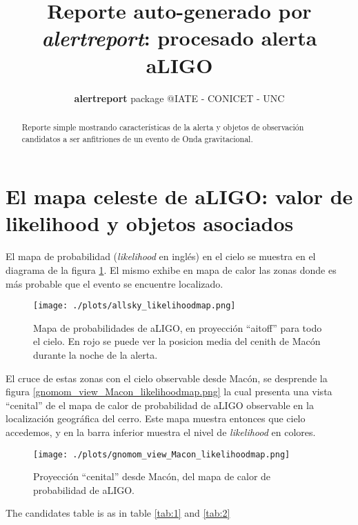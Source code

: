 \documentclass[a4paper,10pt]{article}
\title{Reporte auto-generado por \textit{alertreport}: procesado alerta aLIGO}
\author{\textbf{alertreport} package @IATE - CONICET - UNC}
\begin{document}
\maketitle

\begin{abstract}
Reporte simple mostrando caracter\'{i}sticas de la alerta y objetos de observaci\'on 
candidatos a ser anfitriones de un evento de Onda gravitacional.
\end{abstract}

\section{El mapa celeste de aLIGO: valor de likelihood y objetos asociados}
El mapa de probabilidad (\textit{likelihood} en ingl\'es) en el cielo se muestra en el diagrama
de la figura \ref{fig:aitoff_likelihood_map}. El mismo exhibe en mapa de calor las zonas donde es 
m\'as probable que el evento se encuentre localizado.

\begin{figure}
 \centering
 \texttt{[image: ./plots/allsky\_likelihoodmap.png]}
 \caption{Mapa de probabilidades de aLIGO, en proyecci\'on ``aitoff'' para todo el cielo.
 En rojo se puede ver la posicion media del cenith de Mac\'on durante la noche de la alerta.}
 \label{fig:aitoff_likelihood_map}
\end{figure}

El cruce de estas zonas con el cielo observable desde Mac\'on, se desprende la figura 
\ref{gnomom_view_Macon_likelihoodmap.png} la cual presenta una vista ``cenital'' de el 
mapa de calor de probabilidad de aLIGO observable en la localizaci\'on geogr\'afica del cerro.
Este mapa muestra entonces que cielo accedemos, y en la barra inferior muestra el nivel de 
\textit{likelihood} en colores.

\begin{figure}
 \centering
 \texttt{[image: ./plots/gnomom\_view\_Macon\_likelihoodmap.png]}
 \caption{Proyecci\'on ``cenital'' desde Mac\'on, del mapa de calor de probabilidad de aLIGO.}
 \label{fig:gnomom_view_Macon_likelihoodmap}
\end{figure}



The candidates table is as in table \ref{tab:1} and \ref{tab:2}
\end{document}
